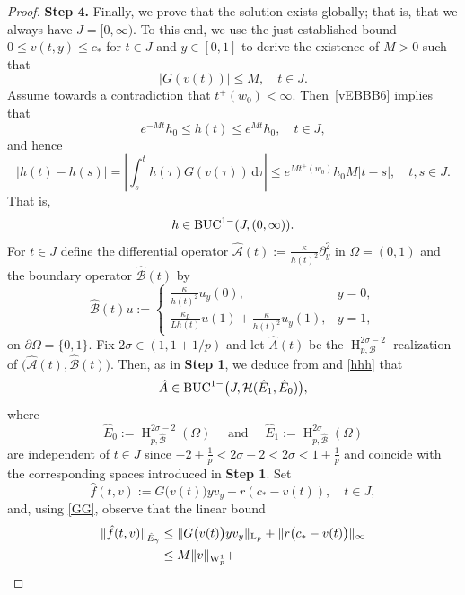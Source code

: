 \documentclass[reqno,11pt]{amsart}
\numberwithin{equation}{section}
\newcommand{\rd}{\mathrm{d}}
\begin{document}
\begin{proof}
{\bf Step 4.} Finally, we prove that the solution exists globally;
that is, that we always have $J=[0,\infty)$. To this end, we use
the just established bound $0\le v(t,y)\le c_*$ for $t\in J$ and $y\in
[0,1]$ to derive the existence of $M>0$ such that
\begin{equation}\label{GG}
\vert G(v(t))\vert\le M, \quad t\in J.
\end{equation} 
Assume towards a contradiction that
$t^+(w_0)<\infty$. Then~\eqref{vEBBB6} implies that
\begin{equation}\label{hh}
e^{-Mt}h_0\le h(t)\le e^{Mt}h_0,\quad t\in J,
\end{equation}
and hence 
$$
\vert h(t)-h(s)\vert=\left\vert\int_s^t h(\tau) G(v(\tau))\,\rd
  \tau\right\vert\le e^{Mt^+(w_0)}h_0 M\vert t-s\vert,\quad t,s\in J.
$$
That is, 
\begin{equation}\label{hhh}
h\in {\rm BUC}^{1-}(J,(0,\infty)).
\end{equation}
For $t\in J$ define the differential operator $\hat{\mathcal{A}}(t):= \frac{\kappa}{h(t)^2} \partial_y^2$
in $\Omega=(0,1)$ and the boundary operator $\hat{\mathcal{B}}(t)$
 by
$$
\hat{\mathcal{B}}(t)u:=\begin{cases} \frac{\kappa}{h(t)^2}u_y(0), & y=0,\\[1ex]
 \frac{\kappa_L}{Lh(t)}u(1)+\frac{\kappa}{h(t)^2} u_y(1), & y=1,
\end{cases} 
$$
on $\partial\Omega=\{0,1\}$. Fix $2\sigma\in (1,1+1/p)$ and let
$\hat{A}(t)$ be the
$\operatorname{H}_{p,\mathcal{B}}^{2\sigma-2}$-realization of
$\bigl( \hat{\mathcal{A}}(t),\hat{\mathcal{B}}(t)\bigr)$. Then, as in {\bf Step 1}, we deduce from \cite[Theorem~8.3]{Amann_Teubner}
and \eqref{hhh}  that
\begin{equation}\label{Ahatsigma}
\hat{A}\in
{\rm BUC}^{1-}\big(J,\mathcal{H}(\hat{E}_1,\hat{E}_0)\big),
\end{equation}
where
$$
\hat{E}_0:=\operatorname{H}_{p,\hat{\mathcal{B}}}^{2\sigma-2}(\Omega)
\quad\text{ and } \quad\hat{E}_1:=\operatorname{H}_{p,\hat{\mathcal{B}}}^{2\sigma}(\Omega) 
$$
are independent of $t\in J$ since
$-2+\frac{1}{p}<2\sigma-2<2\sigma<1+\frac{1}{p}$ 
and coincide with the corresponding spaces introduced in {\bf Step 1}. Set 
$$
\hat{f}(t,v):=G\bigl( v(t) \bigr)y v_y+r(c_*-v(t)), \quad t\in J,
$$
and, using \eqref{GG}, observe that the linear bound
\begin{align}\label{fest}\notag
\|\hat{f}(t,v)\|_{\hat{E}_\gamma}&\le \|G\bigl( v (t) \bigr) y v_y\|_{{\rm L}_p} +
\|r\bigl(c_*- v(t) \bigr)\|_\infty\\&\le M\|v\|_{\operatorname{W}_p^1}+

\end{align}
\end{proof}
\end{document}
